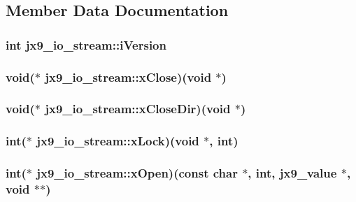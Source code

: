 \subsection{Member Data Documentation}
\hypertarget{structjx9__io__stream_a9c726e7797568d479de1044c0bafbed5}{
\subsubsection[{i\-Version}]{\setlength{\rightskip}{0pt plus 5cm}int jx9\-\_\-io\-\_\-stream\-::i\-Version}}\label{d0/d90/structjx9__io__stream_a9c726e7797568d479de1044c0bafbed5}
\hypertarget{structjx9__io__stream_a5a5fdda998b03d7e8ffac07d0f6ef6cf}{
\subsubsection[{x\-Close}]{\setlength{\rightskip}{0pt plus 5cm}void($\ast$ jx9\-\_\-io\-\_\-stream\-::x\-Close)(void $\ast$)}}\label{d0/d90/structjx9__io__stream_a5a5fdda998b03d7e8ffac07d0f6ef6cf}
\hypertarget{structjx9__io__stream_af8abb5f784be5285a9f6d75a24f9ff7e}{
\subsubsection[{x\-Close\-Dir}]{\setlength{\rightskip}{0pt plus 5cm}void($\ast$ jx9\-\_\-io\-\_\-stream\-::x\-Close\-Dir)(void $\ast$)}}\label{d0/d90/structjx9__io__stream_af8abb5f784be5285a9f6d75a24f9ff7e}
\hypertarget{structjx9__io__stream_a3db6ad62b21591bdc81d620d2bcd9d0b}{
\subsubsection[{x\-Lock}]{\setlength{\rightskip}{0pt plus 5cm}int($\ast$ jx9\-\_\-io\-\_\-stream\-::x\-Lock)(void $\ast$, int)}}\label{d0/d90/structjx9__io__stream_a3db6ad62b21591bdc81d620d2bcd9d0b}
\hypertarget{structjx9__io__stream_a89e195ec0aacccff02027e00314b76b2}{
\subsubsection[{x\-Open}]{\setlength{\rightskip}{0pt plus 5cm}int($\ast$ jx9\-\_\-io\-\_\-stream\-::x\-Open)(const char $\ast$, int, {\bf jx9\-\_\-value} $\ast$, void $\ast$$\ast$)}}\label{d0/d90/structjx9__io__stream_a89e195ec0aacccff02027e00314b76b2}
